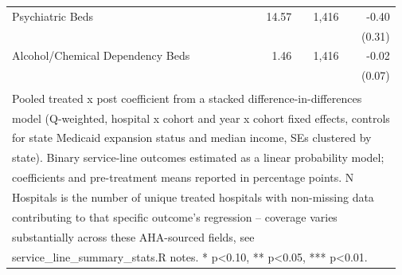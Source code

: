 \begin{table}[!h]
\begin{tabular}[t]{lrrr}
\hspace{1em}Psychiatric Beds & 14.57 & 1,416 & -0.40\\
\hspace{1em} &  &  & (0.31)\\
\hspace{1em}Alcohol/Chemical Dependency Beds & 1.46 & 1,416 & -0.02\\
\hspace{1em} &  &  & (0.07)\\
\bottomrule
\multicolumn{4}{l}{\textsuperscript{} Pooled treated x post coefficient from a stacked difference-in-differences}\\
\multicolumn{4}{l}{model (Q-weighted, hospital x cohort and year x cohort fixed effects, controls}\\
\multicolumn{4}{l}{for state Medicaid expansion status and median income, SEs clustered by}\\
\multicolumn{4}{l}{state). Binary service-line outcomes estimated as a linear probability model;}\\
\multicolumn{4}{l}{coefficients and pre-treatment means reported in percentage points. N}\\
\multicolumn{4}{l}{Hospitals is the number of unique treated hospitals with non-missing data}\\
\multicolumn{4}{l}{contributing to that specific outcome's regression -- coverage varies}\\
\multicolumn{4}{l}{substantially across these AHA-sourced fields, see}\\
\multicolumn{4}{l}{service\_line\_summary\_stats.R notes. * p<0.10, ** p<0.05, *** p<0.01.}\\
\end{tabular}
\end{table}
